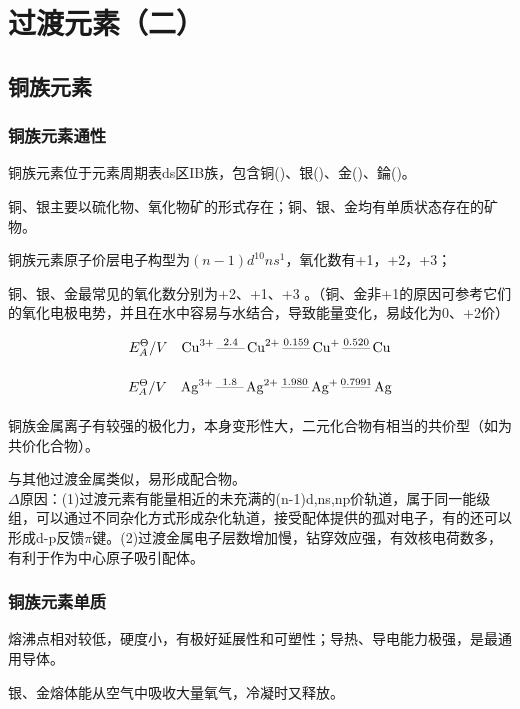\documentclass[a4paper,UTF8]{article}
\begin{document}
\section{过渡元素（二）}

\subsection{铜族元素}

\subsubsection{铜族元素通性}

铜族元素位于元素周期表ds区IB族，包含铜()、银()、金()、錀()。

铜、银主要以硫化物、氧化物矿的形式存在；铜、银、金均有单质状态存在的矿物。

铜族元素原子价层电子构型为$(n-1)d^{10}ns^{1}$，氧化数有+1，+2，+3；

铜、银、金最常见的氧化数分别为+2、+1、+3 。（铜、金非+1的原因可参考它们的氧化电极电势，并且在水中容易与水结合，导致能量变化，易歧化为0、+2价）

$$ E^{\Theta}_{A}/V \quad \ce{Cu^{3+} \overset{2.4}{\text{------}} Cu^{2+} \overset{0.159}{\underset{}{\text{------}}} Cu+ \overset{0.520}{\underset{}{\text{------}}} Cu}$$

$$ E^{\Theta}_{A}/V  \quad \ce{Ag^{3+} \overset{1.8}{\underset{}{\text{------}}} Ag^{2+} \overset{1.980}{\underset{}{\text{------}}} Ag+ \overset{0.7991}{\underset{}{\text{------}}} Ag} $$




铜族金属离子有较强的极化力，本身变形性大，二元化合物有相当的共价型（如为共价化合物）。

与其他过渡金属类似，易形成配合物。\\$\Delta$原因：(1)过渡元素有能量相近的未充满的(n-1)d,ns,np价轨道，属于同一能级组，可以通过不同杂化方式形成杂化轨道，接受配体提供的孤对电子，有的还可以形成d-p反馈$\pi$键。(2)过渡金属电子层数增加慢，钻穿效应强，有效核电荷数多，有利于作为中心原子吸引配体。

\subsubsection{铜族元素单质}
熔沸点相对较低，硬度小，有极好延展性和可塑性；导热、导电能力极强，是最通用导体。

银、金熔体能从空气中吸收大量氧气，冷凝时又释放。
\end{document}
